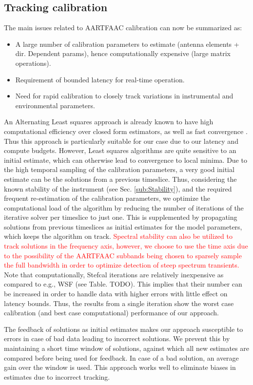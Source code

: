 \documentclass{aa}
\begin{document}
\subsection{Tracking calibration}

The main issues related to AARTFAAC calibration can now be summarized
as:
\begin{itemize}
\item A large number of calibration parameters to estimate (antenna elements
+ dir. Dependent params), hence computationally expensive (large matrix
operations).
\item Requirement of bounded latency for real-time operation. 
\item Need for rapid calibration to closely track variations in instrumental
and environmental parameters.
\end{itemize}
An Alternating Least squares approach is already known to have high
computational efficiency over closed form estimators, as well as fast
convergence \citep{boonstra2003gain}. Thus this approach is particularly
suitable for our case due to our latency and compute budgets. However,
Least squares algorithms are quite sensitive to an initial estimate,
which can otherwise lead to convergence to local minima. Due to the
high temporal sampling of the calibration parameters, a very good
initial estimate can be the solutions from a previous timeslice. Thus,
considering the known stability of the instrument (see Sec. \ref{sub:Stability}),
and the required frequent re-estimation of the calibration parameters,
we optimize the computational load of the algorithm by reducing the
number of iterations of the iterative solver per timeslice to just
one. This is supplemented by propagating solutions from previous timeslices
as initial estimates for the model parameters, which keeps the algorithm
on track. \textcolor{red}{Spectral stability can also be utilized
to track solutions in the frequency axis, however, we choose to use
the time axis due to the possibility of the AARTFAAC subbands being
chosen to sparsely sample the full bandwidth in order to optimize
detection of steep spectrum transients.} Note that computationally,
Stefcal iterations are relatively inexpensive as compared to e.g.,
WSF (see Table. TODO). This implies that their number can be increased
in order to handle data with higher errors with little effect on latency
bounds. Thus, the results from a single iteration show the worst case
calibration (and best case computational) performance of our approach.

The feedback of solutions as initial estimates makes our approach
susceptible to errors in case of bad data leading to incorrect solutions.
We prevent this by maintaining a short time window of solutions, against
which all new estimates are compared before being used for feedback.
In case of a bad solution, an average gain over the window is used.
This approach works well to eliminate biases in estimates due to incorrect
tracking. 
\end{document}
